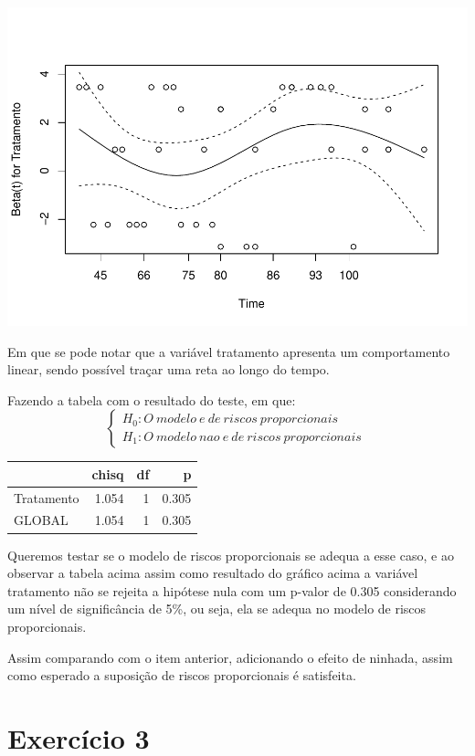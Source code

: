 \documentclass[]{article}
\begin{document}
\begin{center}\includegraphics[width=0.8\linewidth]{Lista_5_files/figure-latex/unnamed-chunk-16-1} \end{center}

Em que se pode notar que a variável tratamento apresenta um
comportamento linear, sendo possível traçar uma reta ao longo do tempo.

Fazendo a tabela com o resultado do teste, em que:
\[ \left\{ \begin{array}{ll}
H_0: O \ modelo \ e \ de \ riscos \ proporcionais \\
H_1: O \ modelo \ nao \ e \ de \ riscos \ proporcionais  \end{array} \right.\ \]

\begin{longtable}[]{@{}lrrr@{}}
\toprule
& chisq & df & p\tabularnewline
\midrule
\endhead
Tratamento & 1.054 & 1 & 0.305\tabularnewline
GLOBAL & 1.054 & 1 & 0.305\tabularnewline
\bottomrule
\end{longtable}

Queremos testar se o modelo de riscos proporcionais se adequa a esse
caso, e ao observar a tabela acima assim como resultado do gráfico acima
a variável tratamento não se rejeita a hipótese nula com um p-valor de
0.305 considerando um nível de significância de 5\%, ou seja, ela se
adequa no modelo de riscos proporcionais.

Assim comparando com o item anterior, adicionando o efeito de ninhada,
assim como esperado a suposição de riscos proporcionais é satisfeita.

\section{Exercício 3}\label{exercicio-3}
\end{document}
